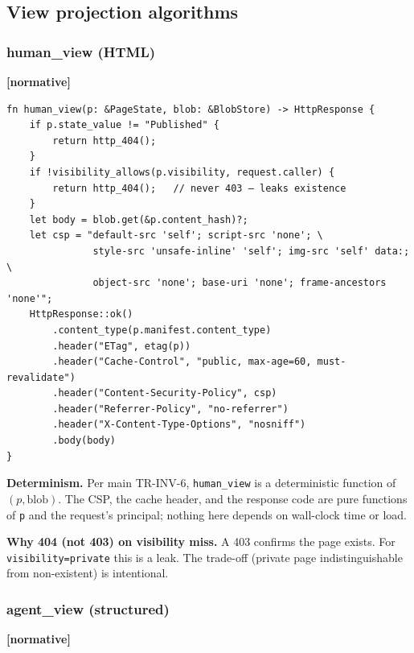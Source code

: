 \documentclass[11pt,a4paper]{article}
\newcommand{\normsv}{\textcolor{normativecolor}{\textbf{[normative]}}\xspace}
\theoremstyle{definition}
\begin{document}
\subsection{View projection algorithms}
\label{sec:algo-views}

\subsubsection{human\_view (HTML)}

\normsv{}

\begin{lstlisting}
fn human_view(p: &PageState, blob: &BlobStore) -> HttpResponse {
    if p.state_value != "Published" {
        return http_404();
    }
    if !visibility_allows(p.visibility, request.caller) {
        return http_404();   // never 403 — leaks existence
    }
    let body = blob.get(&p.content_hash)?;
    let csp = "default-src 'self'; script-src 'none'; \
               style-src 'unsafe-inline' 'self'; img-src 'self' data:; \
               object-src 'none'; base-uri 'none'; frame-ancestors 'none'";
    HttpResponse::ok()
        .content_type(p.manifest.content_type)
        .header("ETag", etag(p))
        .header("Cache-Control", "public, max-age=60, must-revalidate")
        .header("Content-Security-Policy", csp)
        .header("Referrer-Policy", "no-referrer")
        .header("X-Content-Type-Options", "nosniff")
        .body(body)
}
\end{lstlisting}

\textbf{Determinism.} Per main TR-INV-6, \texttt{human\_view} is a
deterministic function of $(p, \text{blob})$. The CSP, the cache
header, and the response code are pure functions of \texttt{p}
and the request's principal; nothing here depends on wall-clock
time or load.

\textbf{Why 404 (not 403) on visibility miss.} A 403 confirms the
page exists. For \texttt{visibility=private} this is a leak. The
trade-off (private page indistinguishable from non-existent) is
intentional.

\subsubsection{agent\_view (structured)}

\normsv{}
\end{document}
